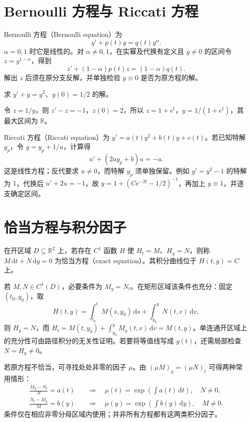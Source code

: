 \documentclass[UTF8,12pt,a4paper,fontset=fandol]{ctexbook}
\begin{document}
\section{Bernoulli 方程与 Riccati 方程}
Bernoulli 方程（Bernoulli equation）为
\[
 y'+p(t)y=q(t)y^\alpha.
\]
$\alpha=0,1$ 时它是线性的。对 $\alpha\ne0,1$，在实幂及代换有定义且 $y\ne0$ 的区间令 $z=y^{1-\alpha}$，得到
\[
 z'+(1-\alpha)p(t)z=(1-\alpha)q(t).
\]
解出 $z$ 后须在原分支反解，并单独检验 $y\equiv0$ 是否为原方程的解。

\begin{example}
求 $y'+y=y^2$、$y(0)=1/2$ 的解。
\end{example}
\begin{solve}
令 $z=1/y$，则 $z'-z=-1$，$z(0)=2$，所以 $z=1+e^t$，$y=1/(1+e^t)$，其最大区间为 $\mathbb R$。
\end{solve}

Riccati 方程（Riccati equation）为 $y'=a(t)y^2+b(t)y+c(t)$。若已知特解 $y_p$，令 $y=y_p+1/u$，计算得
\[
 u'+(2ay_p+b)u=-a.
\]
这是线性方程；反代要求 $u\ne0$，而特解 $y_p$ 须单独保留。例如 $y'=y^2-1$ 的特解为 $1$，代换后 $u'+2u=-1$，故 $y=1+(Ce^{-2t}-1/2)^{-1}$，再加上 $y\equiv1$，并逐支确定区间。

\section{恰当方程与积分因子}
\begin{definition}
在开区域 $D\subseteq\mathbb R^2$ 上，若存在 $C^1$ 函数 $H$ 使 $H_t=M$、$H_y=N$，则称 $M\,\mathrm dt+N\,\mathrm dy=0$ 为恰当方程（exact equation）。其积分曲线位于 $H(t,y)=C$ 上。
\end{definition}

若 $M,N\in C^1(D)$，必要条件为 $M_y=N_t$。在矩形区域该条件也充分：固定 $(t_0,y_0)$，取
\[
 H(t,y)=\int_{t_0}^t M(s,y_0)\,\mathrm ds+\int_{y_0}^y N(t,v)\,\mathrm dv,
\]
则 $H_y=N$，而 $H_t=M(t,y_0)+\int_{y_0}^y M_y(t,v)\,\mathrm dv=M(t,y)$。单连通开区域上的充分性可由路径积分的无关性证明。若要将等值线写成 $y(t)$，还需局部检查 $N=H_y\ne0$。

若原方程不恰当，可寻找处处非零的因子 $\mu$。由 $(\mu M)_y=(\mu N)_t$ 可得两种常用情形：
\begin{align*}
 \frac{M_y-N_t}{N}=a(t)&\quad\Longrightarrow\quad \mu(t)=\exp\!\left(\int a(t)\,\mathrm dt\right),\quad N\ne0,\\
 \frac{N_t-M_y}{M}=b(y)&\quad\Longrightarrow\quad \mu(y)=\exp\!\left(\int b(y)\,\mathrm dy\right),\quad M\ne0.
\end{align*}
条件仅在相应非零分母区域内使用；并非所有方程都有这两类积分因子。
\end{document}
